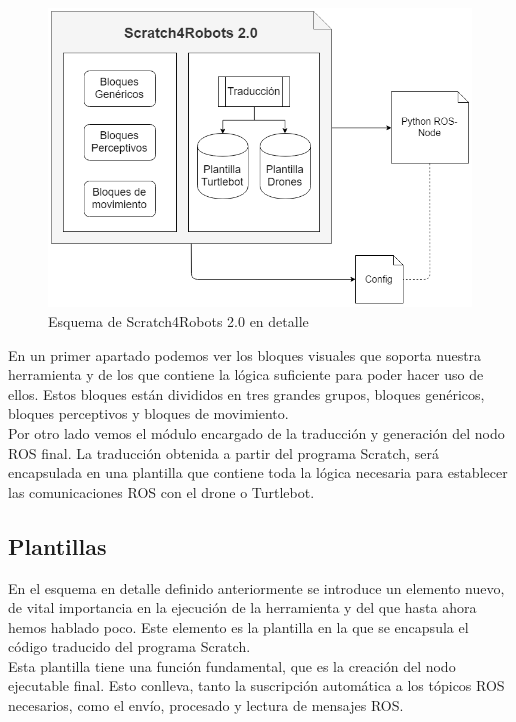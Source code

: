 \begin{figure}[H]
    \centering
    \includegraphics[scale=0.55]{img/esq-caja-blanca.png}
  	\caption{Esquema de Scratch4Robots 2.0 en detalle}
  	\label{fig:s4r}
\end{figure}

En un primer apartado podemos ver los bloques visuales que soporta nuestra herramienta y de los que contiene la lógica suficiente para poder hacer uso de ellos. Estos bloques están divididos en tres grandes grupos, bloques genéricos, bloques perceptivos y bloques de movimiento.\\

Por otro lado vemos el módulo encargado de la traducción y generación del nodo ROS final. La traducción obtenida a partir del programa Scratch, será encapsulada en una plantilla que contiene toda la lógica necesaria para establecer las comunicaciones ROS con el drone o Turtlebot.

\subsection{Plantillas}
En el esquema en detalle definido anteriormente se introduce un elemento nuevo, de vital importancia en la ejecución de la herramienta y del que hasta ahora hemos hablado poco. Este elemento es la plantilla en la que se encapsula el código traducido del programa Scratch.\\

Esta plantilla tiene una función fundamental, que es la creación del nodo ejecutable final. Esto conlleva, tanto la suscripción automática a los tópicos ROS necesarios, como el envío, procesado y lectura de mensajes ROS.\\


